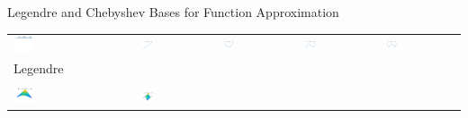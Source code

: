 \documentclass[10pt,compress,xcolor={usenames,dvipsnames},aspectratio=169]{beamer}
\begin{document}
\begin{frame}{Legendre and Chebyshev Bases for Function Approximation}
\vspace{-3ex}
	\begin{tabular}{>{\centering}m{}>{\centering}m{}>{\centering}m{}>{\centering}m{}>{\centering}m{}}
		\includegraphics[width =0.18\textwidth]{ProgramsImages/Legendre_Degree_0.png}  &
		\includegraphics[width =0.18\textwidth]{ProgramsImages/Legendre_Degree_1.png}  &
		\includegraphics[width =0.18\textwidth]{ProgramsImages/Legendre_Degree_2.png}  &
		\includegraphics[width =0.18\textwidth]{ProgramsImages/Legendre_Degree_3.png}  &
		\includegraphics[width =0.18\textwidth]{ProgramsImages/Legendre_Degree_4.png} 
	\tabularnewline[-7ex]
	Legendre
	\tabularnewline
	\tabularnewline
		\includegraphics[width =0.18\textwidth]{ProgramsImages/Legendre_Degree_1_1.png}  &
\includegraphics[width =0.18\textwidth]{ProgramsImages/Legendre_Degree_1_2.png}  &

\end{tabular}
\end{frame}
\end{document}
